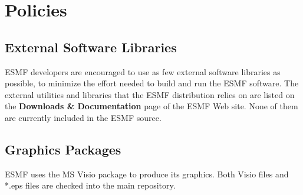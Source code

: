 
\section{Policies}

\subsection{External Software Libraries}
\label{sec:lib}

ESMF developers are encouraged to use as few external
software libraries as possible, to minimize the effort
needed to build and run the ESMF software.  The external
utilities and libraries that the ESMF 
distribution relies on are listed on the {\bf Downloads \&
Documentation} page of the ESMF Web site.  None of them are 
currently included in the ESMF source.

\subsection{Graphics Packages}

ESMF uses the MS Visio package to produce its graphics.
Both Visio files and *.eps files are checked into the 
main repository.



